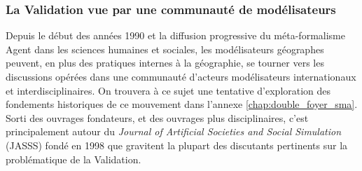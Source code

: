 



\subsubsection{La Validation vue par une communauté de modélisateurs}
\label{sssec:validation_modelisateurs}

Depuis le début des années 1990 et la diffusion progressive du méta-formalisme Agent \autocite{Treuil2008} dans les sciences humaines et sociales, les modélisateurs géographes peuvent, en plus des pratiques internes à la géographie, se tourner vers les discussions opérées dans une communauté d'acteurs modélisateurs internationaux et interdisciplinaires. On trouvera à ce sujet une tentative d'exploration des fondements historiques de ce mouvement dans l'annexe \ref{chap:double_foyer_sma}. Sorti des ouvrages fondateurs, et des ouvrages plus disciplinaires, c'est principalement autour du \textit{Journal of Artificial Societies and Social Simulation} (JASSS) fondé en 1998 que gravitent la plupart des discutants pertinents sur la problématique de la Validation.

